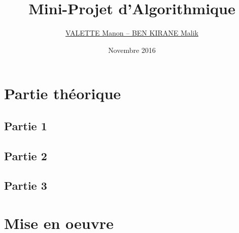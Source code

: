 \documentclass[a4paper,11pt]{article}
\title{Mini-Projet d'Algorithmique}
\author{
  \href{mailto:malikcpp@gmail.com,valette-manon@numericable.fr}{
    VALETTE Manon
    --
    BEN KIRANE Malik 
  }
}
\date{Novembre 2016}
\newcommand\csection[1]{{\centering\section{#1}\par}}
\begin{document}
\maketitle
\tableofcontents
\csection{Partie th\'eorique}
\subsection*{Partie 1}

\subsection*{Partie 2}

\pagebreak
\subsection*{Partie 3}

\pagebreak
\csection{Mise en oeuvre}

\end{document}
